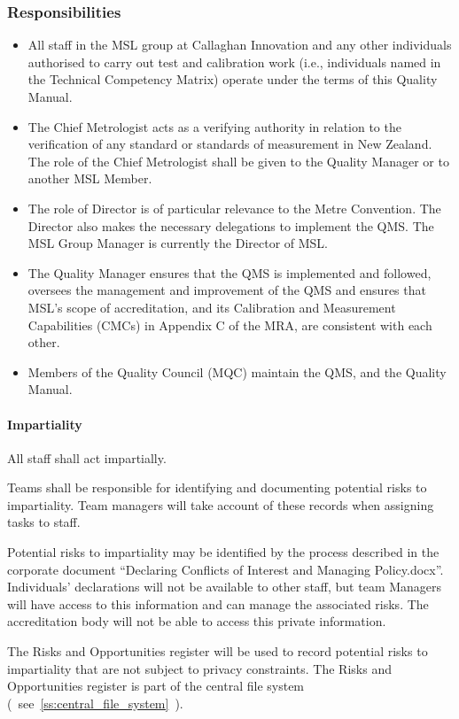 \subsubsection{Responsibilities} 
\begin{itemize}
\item	All staff in the MSL group at Callaghan Innovation and any other individuals authorised to carry out test and calibration work (i.e., individuals named in the Technical Competency Matrix) operate under the terms of this Quality Manual.
\item	The Chief Metrologist acts as a verifying authority in relation to the verification of any standard or standards of measurement in New Zealand.  The role of the Chief Metrologist shall be given to the Quality Manager or to another MSL Member.  
\item	The role of Director is of particular relevance to the Metre Convention. The Director also makes the necessary delegations to implement the QMS. The MSL Group Manager is currently the Director of MSL. 
\item	The Quality Manager ensures that the QMS is implemented and followed, oversees the management and improvement of the QMS and ensures that MSL's scope of accreditation, and its Calibration and Measurement Capabilities (CMCs) in Appendix C of the MRA, are 
consistent with each other.
\item	Members of the Quality Council (MQC) maintain the QMS, and the Quality Manual.

\end{itemize}

\paragraph{Impartiality}
\label{sssp:impartiality}
All staff shall act impartially.

Teams shall be responsible for identifying and documenting potential risks to impartiality. Team managers will take account of these records when assigning tasks to staff.

Potential risks to impartiality may be identified by the process described in the corporate document ``Declaring Conflicts of Interest and Managing Policy.docx''. Individuals' declarations will not be available to other staff, but team Managers will have access to this information and can manage the associated risks. The accreditation body will not be able to access this private information. 

The Risks and Opportunities register will be used to record potential risks to impartiality that are not subject to privacy constraints. The Risks and Opportunities register is part of the central file system (~see~\ref{ss:central_file_system}~).

